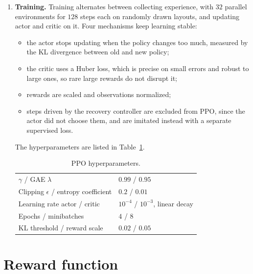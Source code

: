\documentclass[11pt,a4paper]{article}
\begin{document}
\begin{enumerate}[label=\textbf{\arabic*.},resume]
\item \textbf{Training.}
Training alternates between collecting experience, with $32$ parallel
environments for $128$ steps each on randomly drawn layouts, and updating
actor and critic on it. Four mechanisms keep learning stable:
\begin{itemize}
 \item the actor stops updating when the policy changes too much, measured
       by the KL divergence between old and new policy;
 \item the critic uses a Huber loss, which is precise on small errors and
       robust to large ones, so rare large rewards do not disrupt it;
 \item rewards are scaled and observations normalized;
 \item steps driven by the recovery controller are excluded from PPO, since
       the actor did not choose them, and are imitated instead with a
       separate supervised loss.
\end{itemize}
The hyperparameters are listed in Table~\ref{tab:ppo_hparams}.

\begin{table}[h]
\centering
\begin{tabular}{ll}
\toprule
$\gamma$ / GAE $\lambda$ & $0.99$ / $0.95$ \\
Clipping $\epsilon$ / entropy coefficient & $0.2$ / $0.01$ \\
Learning rate actor / critic & $10^{-4}$ / $10^{-3}$, linear decay \\
Epochs / minibatches & $4$ / $8$ \\
KL threshold / reward scale & $0.02$ / $0.05$ \\
\bottomrule
\end{tabular}
\caption{PPO hyperparameters.}
\label{tab:ppo_hparams}
\end{table}

\end{enumerate}

\section{Reward function}
\end{document}
